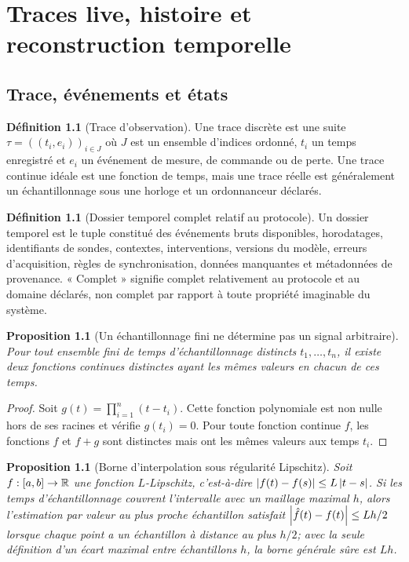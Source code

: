 \documentclass[11pt,oneside]{book}
\newtheorem{proposition}[theoreme]{Proposition}
\theoremstyle{definition}\newtheorem{definition}[theoreme]{Définition}\newtheorem{hypothese}[theoreme]{Hypothèse explicite}\newtheorem{convention}[theoreme]{Convention}\newtheorem{critere}[theoreme]{Critère}
\theoremstyle{remark}\newtheorem{remarque}[theoreme]{Remarque}\newtheorem{contreexemple}[theoreme]{Contre-exemple}
\begin{document}
\chapter{Traces live, histoire et reconstruction temporelle}
\section{Trace, événements et états}
\begin{definition}[Trace d'observation]
Une trace discrète est une suite \(\tau=((t_i,e_i))_{i\in J}\) où \(J\) est un ensemble d'indices ordonné, \(t_i\) un temps enregistré et \(e_i\) un événement de mesure, de commande ou de perte. Une trace continue idéale est une fonction de temps, mais une trace réelle est généralement un échantillonnage sous une horloge et un ordonnanceur déclarés.
\end{definition}
\begin{definition}[Dossier temporel complet relatif au protocole]
Un dossier temporel est le tuple constitué des événements bruts disponibles, horodatages, identifiants de sondes, contextes, interventions, versions du modèle, erreurs d'acquisition, règles de synchronisation, données manquantes et métadonnées de provenance. « Complet » signifie complet relativement au protocole et au domaine déclarés, non complet par rapport à toute propriété imaginable du système.
\end{definition}
\begin{proposition}[Un échantillonnage fini ne détermine pas un signal arbitraire]
Pour tout ensemble fini de temps d'échantillonnage distincts \(t_1,\ldots,t_n\), il existe deux fonctions continues distinctes ayant les mêmes valeurs en chacun de ces temps.
\end{proposition}
\begin{proof}
Soit \(g(t)=\prod_{i=1}^n(t-t_i)\). Cette fonction polynomiale est non nulle hors de ses racines et vérifie \(g(t_i)=0\). Pour toute fonction continue \(f\), les fonctions \(f\) et \(f+g\) sont distinctes mais ont les mêmes valeurs aux temps \(t_i\).\end{proof}
\begin{proposition}[Borne d'interpolation sous régularité Lipschitz]
Soit \(f:[a,b]\to\mathbb R\) une fonction \(L\)-Lipschitz, c'est-à-dire \(\left\lvert f(t)-f(s)\right\rvert\le L\left\lvert t-s\right\rvert\). Si les temps d'échantillonnage couvrent l'intervalle avec un maillage maximal \(h\), alors l'estimation par valeur au plus proche échantillon satisfait \(\left\lvert\hat f(t)-f(t)\right\rvert\le Lh/2\) lorsque chaque point a un échantillon à distance au plus \(h/2\); avec la seule définition d'un écart maximal entre échantillons \(h\), la borne générale sûre est \(Lh\).
\end{proposition}
\end{document}
